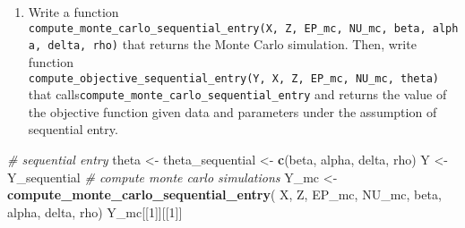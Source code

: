 \documentclass[
]{book}
\newenvironment{Shaded}{\begin{snugshade}}{\end{snugshade}}
\newcommand{\CommentTok}[1]{\textcolor[rgb]{0.56,0.35,0.01}{\textit{#1}}}
\newcommand{\DataTypeTok}[1]{\textcolor[rgb]{0.13,0.29,0.53}{#1}}
\newcommand{\DecValTok}[1]{\textcolor[rgb]{0.00,0.00,0.81}{#1}}
\newcommand{\KeywordTok}[1]{\textcolor[rgb]{0.13,0.29,0.53}{\textbf{#1}}}
\newcommand{\NormalTok}[1]{#1}
\newcommand{\OperatorTok}[1]{\textcolor[rgb]{0.81,0.36,0.00}{\textbf{#1}}}
\newcommand{\StringTok}[1]{\textcolor[rgb]{0.31,0.60,0.02}{#1}}
\providecommand{\tightlist}{%
  \setlength{\itemsep}{0pt}\setlength{\parskip}{0pt}}
\begin{document}
\begin{Shaded}
\end{Shaded}

\begin{enumerate}
\def\labelenumi{\arabic{enumi}.}
\setcounter{enumi}{1}
\tightlist
\item
  Write a function \texttt{compute\_monte\_carlo\_sequential\_entry(X,\ Z,\ EP\_mc,\ NU\_mc,\ beta,\ alpha,\ delta,\ rho)} that returns the Monte Carlo simulation. Then, write function \texttt{compute\_objective\_sequential\_entry(Y,\ X,\ Z,\ EP\_mc,\ NU\_mc,\ theta)} that calls\texttt{compute\_monte\_carlo\_sequential\_entry} and returns the value of the objective function given data and parameters under the assumption of sequential entry.
\end{enumerate}

\begin{Shaded}
\begin{Highlighting}[]
\CommentTok{# sequential entry}
\NormalTok{theta <-}\StringTok{ }\NormalTok{theta_sequential <-}
\StringTok{  }\KeywordTok{c}\NormalTok{(beta, alpha, delta, rho)}
\NormalTok{Y <-}\StringTok{ }\NormalTok{Y_sequential}
\CommentTok{# compute monte carlo simulations }
\NormalTok{Y_mc <-}\StringTok{ }
\StringTok{  }\KeywordTok{compute_monte_carlo_sequential_entry}\NormalTok{(}
\NormalTok{    X, Z, EP_mc, NU_mc, beta, alpha, delta, rho)}
\NormalTok{Y_mc[[}\DecValTok{1}\NormalTok{]][[}\DecValTok{1}\NormalTok{]]}
\end{Highlighting}
\end{Shaded}
\end{document}
